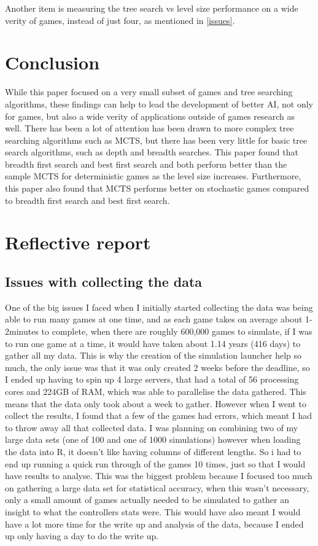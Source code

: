 \documentclass[journal]{IEEEtran}
\begin{document}
Another item is measuring the tree search vs level size performance on a wide verity of games, instead of just four, as mentioned in \ref{issues}.



\section{Conclusion}
While this paper focused on a very small subset of games and tree searching algorithms, these findings can help to lead the development of better AI, not only for games, but also a wide verity of applications outside of games research as well.
There has been a lot of attention has been drawn to more complex tree searching algorithms such as MCTS, but there has been very little for basic tree search algorithms, such as depth and breadth searches.
This paper found that breadth first search and best first search and both perform better than the sample MCTS for deterministic games as the level size increases. Furthermore, this paper also found that MCTS performs better on stochastic games compared to breadth first search and best first search.



	\appendices
		\section{Reflective report}
		\subsection{Issues with collecting the data}
			One of the big issues I faced when I initially started collecting the data was being able to run many games at one time, and as each game takes on average about 1-2minutes to complete, when there are roughly 600,000 games to simulate, if I was to run one game at a time, it would have taken about 1.14 years (416 days) to gather all my data. This is why the creation of the simulation launcher help so much, the only issue was that it was only created 2 weeks before the deadline, so I ended up having to spin up 4 large servers, that had a total of 56 processing cores and 224GB of RAM, which was able to parallelise the data gathered. This means that the data only took about a week to gather. However when I went to collect the results, I found that a few of the games had errors, which meant I had to throw away all that collected data. I was planning on combining two of my large data sets (one of 100 and one of 1000 simulations) however when loading the data into R, it doesn't like having columns of different lengths. So i had to end up running a quick run through of the games 10 times, just so that I would have results to analyse.
			This was the biggest problem because I focused too much on gathering  a large data set for statistical accuracy, when this wasn't necessary, only a small amount of games actually needed to be simulated to gather an insight to what the controllers stats were. This would have also meant I would have a lot more time for the write up and analysis of the data, because I ended up only having a day to do the write up.
\end{document}
